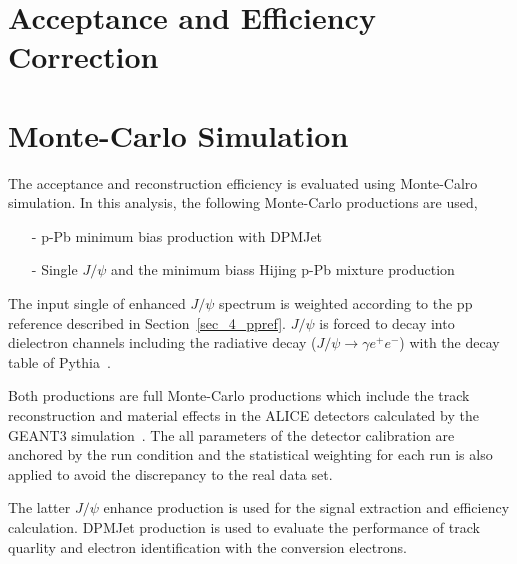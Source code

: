 
\section{Acceptance and Efficiency Correction}

\section{Monte-Carlo Simulation}
\label{sec_4_mc}
The acceptance and reconstruction efficiency is evaluated  using Monte-Calro simulation.  
In this analysis, the following Monte-Carlo productions are used,  
\begin{itemize}
\item[-] p-Pb minimum bias production with DPMJet~\cite{bib_dpmjet} 
\item[-] Single $J/\psi$ and the minimum biass Hijing p-Pb mixture production~\cite{bib_hijing}
\end{itemize}
The input single of enhanced $J/\psi$ spectrum is weighted according to the pp reference described in Section~\ref{sec_4_ppref}.
$J/\psi$ is forced to decay into dielectron channels including the radiative decay ($J/\psi\rightarrow \gamma e^{+}e^{-}$) with the decay table of Pythia~\cite{bib_pythia}. 

Both productions are full Monte-Carlo productions which include the track reconstruction and material effects in the ALICE detectors calculated by the GEANT3 simulation~\cite{bib_geant}.  
The all parameters of the detector calibration are anchored by the run condition and the statistical weighting for each run is also applied to avoid the discrepancy to the real data set. 

The latter $J/\psi$ enhance production is used for the signal extraction and efficiency calculation.
DPMJet production is used to evaluate the performance of track quarlity and electron identification with the conversion electrons.

